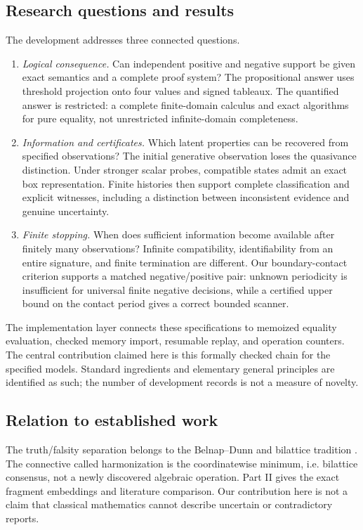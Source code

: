 \documentclass[11pt,a4paper]{article}
\begin{document}
\subsection{Research questions and results}
The development addresses three connected questions.
\begin{enumerate}
\item \emph{Logical consequence.} Can independent positive and negative
support be given exact semantics and a complete proof system? The propositional
answer uses threshold projection onto four values and signed tableaux. The
quantified answer is restricted: a complete finite-domain calculus and exact
algorithms for pure equality, not unrestricted infinite-domain completeness.
\item \emph{Information and certificates.} Which latent properties can be
recovered from specified observations? The initial generative observation loses
the quasivance distinction. Under stronger scalar probes, compatible states
admit an exact box representation. Finite histories then support complete
classification and explicit witnesses, including a distinction between
inconsistent evidence and genuine uncertainty.
\item \emph{Finite stopping.} When does sufficient information become available
after finitely many observations? Infinite compatibility, identifiability from
an entire signature, and finite termination are different. Our boundary-contact
criterion supports a matched negative/positive pair: unknown periodicity is
insufficient for universal finite negative decisions, while a certified upper
bound on the contact period gives a correct bounded scanner.
\end{enumerate}
The implementation layer connects these specifications to memoized equality
evaluation, checked memory import, resumable replay, and operation counters.
The central contribution claimed here is this formally checked chain for the
specified models. Standard ingredients and elementary general principles are
identified as such; the number of development records is not a measure of novelty.

\subsection{Relation to established work}
The truth/falsity separation belongs to the Belnap--Dunn and bilattice tradition
\cite{belnap1977useful,dunn1976intuitive,fitting1991bilattices}. The connective
called harmonization is the coordinatewise minimum, i.e. bilattice consensus,
not a newly discovered algebraic operation. Part II gives the exact fragment
embeddings and literature comparison. Our contribution here is not a claim that
classical mathematics cannot describe uncertain or contradictory reports.
\end{document}
